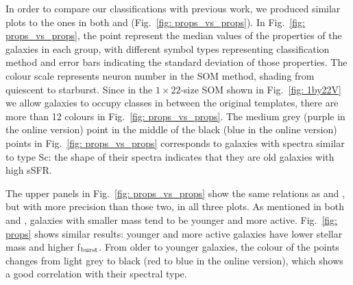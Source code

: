         In order to compare our classifications with previous work, we produced similar plots to the ones in both  and  (Fig.~\ref{fig: props_vs_props}).
        In Fig.~\ref{fig: props_vs_props}, the point represent the median values of the properties of the galaxies in each group, with different symbol types representing classification method and error bars indicating the standard deviation of those properties.
       The colour scale represents neuron number in the SOM method, shading from quiescent to starburst. 
        Since in the $1\times22$-size SOM shown in Fig.~\ref{fig: 1by22V} we allow galaxies to occupy classes in between the original  templates, there are more than 12 colours in Fig.~\ref{fig: props_vs_props}.
        The medium grey (purple in the online version) point in the middle of the black (blue in the online version) points in Fig.~\ref{fig: props_vs_props} corresponds to galaxies with spectra similar to type Sc: the shape of their spectra indicates that they are old galaxies with high sSFR.
        
        The upper panels in Fig.~\ref{fig: props_vs_props} show the same relations as  and , but with more precision than those two, in all three plots.
        As mentioned in both  and , galaxies with smaller mass tend to be younger and more active.
        Fig.~\ref{fig: props} shows similar results: younger and more active galaxies have lower stellar mass and higher f$_{\rm {burst}}$.
        From older to younger galaxies, the colour of the points changes from light grey to black (red to blue in the online version), which shows a good correlation with their spectral type.
        
